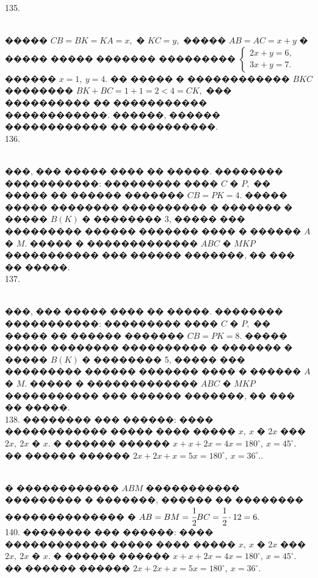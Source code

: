 \documentclass[12pt]{article}
\begin{document}
135. \begin{figure}[ht!]
\end{figure}\\
����� $CB=BK=KA=x,$ � $KC=y,$ ����� $AB=AC=x+y$ � ����� ����� ������� ��������� $\begin{cases} 2x+y=6,\\ 3x+y=7.\end{cases}$ ������ $x=1,\ y=4.$ �� ����� � ������������ $BKC$ �������� $BK+BC=1+1=2<4=CK,$ ��� ���������� �� ����������� ������������. ������, ������ ������������ �� ����������.\\
136. \begin{figure}[ht!]
\end{figure}\\
���, ��� ����� ���� �� �����. �������� �����������: ��������� ���� $C$ � $P,$ �� ����� �� ������ ������� $CB=PK=4.$ ����� ����� �������� ���������� � ������� � ����� $B(K)$ � �������� 3, ����� ��� ��������� ������ ������� ���� � ������ $A$ � $M.$ ����� � ������������� $ABC$ � $MKP$ ����������� ��� ������ �������, �� ��� �� �����.\\
137. \begin{figure}[ht!]
\end{figure}\\
���, ��� ����� ���� �� �����. �������� �����������: ��������� ���� $C$ � $P,$ �� ����� �� ������ ������� $CB=PK=8.$ ����� ����� �������� ���������� � ������� � ����� $B(K)$ � �������� 5, ����� ��� ��������� ������ ������� ���� � ������ $A$ � $M.$ ����� � ������������� $ABC$ � $MKP$ ����������� ��� ������ �������, �� ��� �� �����.\\
138. �������� ��� ������: ���� ������������ ����� ���� ����� $x,\ x$ � $2x$ ��� $2x,\ 2x$ � $x.$ � ������ ������ $x+x+2x=4x=180^\circ,\ x=45^\circ.$ �� ������ ������ $2x+2x+x=5x=180^\circ,\ x=36^\circ.$\newpage{}. \begin{figure}[ht!]
\end{figure}\\
� ������������ $ABM$ ����������� ��������� � �������, ������ �� �������� �������������� � $AB=BM=\cfrac{1}{2}BC=\cfrac{1}{2}\cdot12=6.$\\
140. �������� ��� ������: ���� ������������ ����� ���� ����� $x,\ x$ � $2x$ ��� $2x,\ 2x$ � $x.$ � ������ ������ $x+x+2x=4x=180^\circ,\ x=45^\circ.$ �� ������ ������ $2x+2x+x=5x=180^\circ,\ x=36^\circ.$\\
\end{document}
